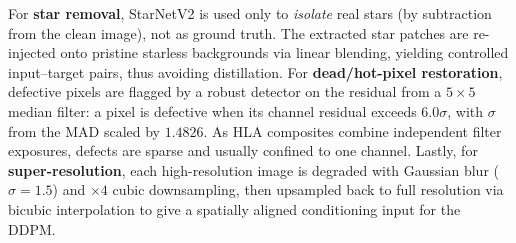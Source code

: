 \documentclass{article}
\begin{document}
For \textbf{star removal}, StarNetV2 \cite{starnet} is used only to \emph{isolate} real stars (by subtraction from the clean image), not as ground truth. The extracted star patches are re-injected onto pristine starless backgrounds via linear blending, yielding controlled input--target pairs, thus avoiding distillation. For \textbf{dead/hot-pixel restoration}, defective pixels are flagged by a robust detector on the residual from a $5\times5$ median filter: a pixel is defective when its channel residual exceeds $6.0\sigma$, with $\sigma$ from the MAD scaled by $1.4826$. As HLA composites combine independent filter exposures, defects are sparse and usually confined to one channel. Lastly, for \textbf{super-resolution}, each high-resolution image is degraded with Gaussian blur ($\sigma=1.5$) and $\times4$ cubic downsampling, then upsampled back to full resolution via bicubic interpolation to give a spatially aligned conditioning input for the DDPM.
\end{document}
